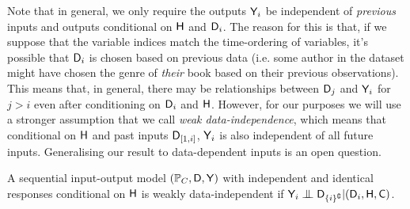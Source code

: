 




Note that in general, we only require the outputs $\mathsf{Y}_i$ be independent of \emph{previous} inputs and outputs conditional on $\mathsf{H}$ and $\mathsf{D}_i$. The reason for this is that, if we suppose that the variable indices match the time-ordering of variables, it's possible that $\mathsf{D}_i$ is chosen based on previous data (i.e. some author in the dataset might have chosen the genre of \emph{their} book based on their previous observations). This means that, in general, there may be relationships between $\mathsf{D}_j$ and $\mathsf{Y}_i$ for $j>i$ even after conditioning on $\mathsf{D}_i$ and $\mathsf{H}$. However, for our purposes we will use a stronger assumption that we call \emph{weak data-independence}, which means that conditional on $\mathsf{H}$ and past inputs $\mathsf{D}_{[1,i]}$, $\mathsf{Y}_i$ is also independent of all future inputs. Generalising our result to data-dependent inputs is an open question.

\begin{definition}\label{def:weak_di}
A sequential input-output model $(\mathbb{P}_C,\mathsf{D},\mathsf{Y})$ with independent and identical responses conditional on $\mathsf{H}$ is weakly data-independent if $\RV{Y}_i\CI \RV{D}_{\{i\}^\complement}|(\RV{D}_{i},\RV{H},\RV{C})$.
\end{definition}

